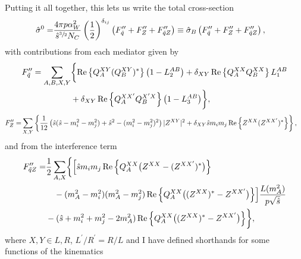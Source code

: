 \documentclass[../main.tex]{subfiles}
\begin{document}
Putting it all together, this lets us write the total cross-section
\begin{align}
  \label{pc:eq:born}
  \hat\sigma^0 = & \frac{4 \pi p \alpha_W^2}{\hat{s}^{\sfrac{3}{2}} N_C} \pclosed{\frac{1}{2}}^{\delta_{ij}} \pclosed{F^{\prime\prime}_{\tilde{q}} + F^{\prime\prime}_Z + F^{\prime\prime}_{\tilde{q}Z}} \equiv \hat{\sigma}_B \pclosed{F^{\prime\prime}_{\tilde{q}} + F^{\prime\prime}_Z + F^{\prime\prime}_{\tilde{q}Z}},
\end{align}
with contributions from each mediator given by
\begin{align}
  \label{pc:eq:eff_coupling_Fq}
  \nonumber
  F^{\prime\prime}_{\tilde{q}} = \sum_{A,B,X,Y} & \biggl\{\Re{Q_A^{XY} (Q_B^{XY})^\ast} \pclosed{1 - L_2^{AB}} + \delta_{XY}\Re{Q_A^{XX} Q_B^{XX}} L_1^{AB} \\
                                                & + \delta_{XY} \Re{Q_A^{XX^\prime} Q_B^{X^\prime X}} \pclosed{1 - L_3^{AB}} \biggr\},
\end{align}
\begin{align}
  \label{pc:eq:eff_coupling_FZ}
  F^{\prime\prime}_{Z} = & \sum_{X,Y} \cclosed{\frac{1}{12} \pclosed{\hat{s}(\hat{s}-m_i^2-m_j^2) + \hat{s}^2 - (m_i^2-m_j^2)^2} |Z^{XY}|^2 + \delta_{XY} \hat{s}m_i m_j \Re{Z^{XX} (Z^{XX^\prime})^\ast}},
\end{align}
and from the interference term
\begin{align}
  \label{pc:eq:eff_coupling_FqZ}
  \nonumber
  F^{\prime\prime}_{\tilde{q}Z} = & \frac{1}{2} \sum_{A, X} \biggl\{
  \Bigl[\hat{s} m_i m_j \Re{Q_A^{XX} \bigl(Z^{XX} - (Z^{XX^\prime})^\ast\bigr)}                                                                                       \\
  \nonumber
                                  & \quad - (m_A^2-m_i^2)(m_A^2-m_j^2) \Re{Q_A^{XX}\bigl((Z^{XX})^\ast - Z^{XX^\prime}\bigr)}\Bigr] \frac{L(m_A^2)}{p \sqrt{\hat{s}}} \\
                                  & - (\hat{s} + m_i^2 + m_j^2 - 2m_A^2) \Re{Q_A^{XX}\bigl((Z^{XX})^\ast - Z^{XX^\prime}\bigr)}
  \biggr\},
\end{align}
where \(X,Y \in L,R\), \(L^\prime/R^\prime = R/L\) and I have defined shorthands for some functions of the kinematics
\end{document}

